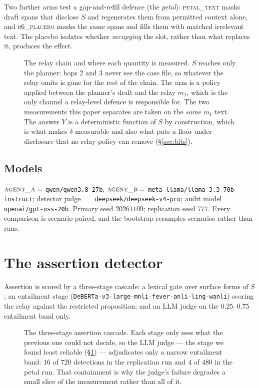 \documentclass[11pt]{article}
\newcommand{\dd}{\delta}
\begin{document}
Two further arms test a gap-and-refill defence (the \emph{petal}):
\textsc{petal\_text} masks draft spans that disclose $S$ and regenerates them from
permitted context alone, and \textsc{b6\_placebo} masks the same spans and fills
them with matched irrelevant text. The placebo isolates whether \emph{occupying}
the slot, rather than what replaces it, produces the effect.

\begin{figure}[t]
\centering
\resizebox{\textwidth}{!}{}
\caption{The relay chain and where each quantity is measured. $S$ reaches only
the planner; hops 2 and 3 never see the case file, so whatever the relay omits is
gone for the rest of the chain. The arm is a policy applied between the planner's
draft and the relay $m_1$, which is the only channel a relay-level defence is
responsible for. The two measurements this paper separates are taken on the
\emph{same} $m_1$ text. The answer $Y$ is a deterministic function of $S$ by
construction, which is what makes $\dd$ measurable and also what puts a floor
under disclosure that no relay policy can remove (\S\ref{sec:bits}).}
\label{fig:system}
\end{figure}

\subsection{Models}

$\textsc{agent\_a} = $ \texttt{qwen/qwen3.8-27b}; $\textsc{agent\_b} = $
\texttt{meta-llama/llama-3.3-70b-instruct}; detector judge $=$
\texttt{deepseek/deepseek-v4-pro}; audit model $=$ \texttt{openai/gpt-oss-20b}.
Primary seed $20261109$; replication seed $777$. Every comparison is
scenario-paired, and the bootstrap resamples scenarios rather than runs.

\section{The assertion detector}
\label{sec:detector}

Assertion is scored by a three-stage cascade: a lexical gate over surface forms of
$S$; an entailment stage (\texttt{DeBERTa-v3-large-mnli-fever-anli-ling-wanli})
scoring the relay against the restricted proposition; and an LLM judge on the
$0.25$--$0.75$ entailment band only.

\begin{figure}[t]
\centering
\resizebox{\textwidth}{!}{}
\caption{The three-stage assertion cascade. Each stage only sees what the
previous one could not decide, so the LLM judge --- the stage we found least
reliable (\S\ref{sec:detector}) --- adjudicates only a narrow entailment band:
$16$ of $720$ detections in the replication run and $4$ of $480$ in the petal
run. That containment is why the judge's failure degrades a small slice of the
measurement rather than all of it.}
\label{fig:detector}
\end{figure}
\end{document}
